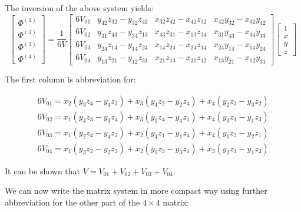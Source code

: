\documentclass[en]{minipw} %
\begin{document}
The inversion of the above system yields:
\begin{equation}
\begin{bmatrix}
\Phi^{(1)} \\
\Phi^{(2)} \\
\Phi^{(3)} \\
\Phi^{(4)}
\end{bmatrix}
=
\dfrac{1}{6V}
\begin{bmatrix}
6V_{01} & y_{42}z_{32} - y_{32}z_{42} & x_{32}z_{42} - x_{42}z_{32} & x_{42}y_{32} - x_{32}y_{42} \\
6V_{02} & y_{31}z_{43} - y_{34}z_{13} & x_{43}z_{31} - x_{13}z_{34} & x_{31}y_{43} - x_{34}y_{13} \\
6V_{03} & y_{24}z_{14} - y_{14}z_{24} & x_{14}z_{24} - x_{24}z_{14} & x_{24}y_{14} - x_{14}y_{24} \\
6V_{04} & y_{13}z_{21} - y_{12}z_{31} & x_{21}z_{13} - x_{31}z_{12} & x_{13}y_{21} - x_{12}y_{31}
\end{bmatrix}
\begin{bmatrix}
1 \\
x \\
y \\
z
\end{bmatrix}
\end{equation}

The first column is abbreviation for:

\begin{equation}
\begin{aligned}
6V_{01} = x_2(y_3z_4 - y_4z_3) + x_3(y_4z_2 - y_2z_4) +x_4(y_2z_3 - y_3z_2)
\\
6V_{02} = x_1(y_4z_3 - y_3z_4) + x_3(y_1z_4 - y_4z_1) +x_4(y_3z_1 - y_1z_3)
\\
6V_{03} = x_1(y_2z_4 - y_4z_2) + x_2(y_4z_1 - y_1z_4) +x_4(y_1z_2 - y_2z_1)
\\
6V_{04} = x_1(y_3z_2 - y_2z_3) + x_2(y_1z_3 - y_3z_1) +x_3(y_2z_1 - y_1z_2)
\end{aligned}
\end{equation}

It can be shown that $V = V_{01} + V_{02} + V_{03} + V_{04}$.

We can now write the matrix system in more compact way using further abbreviation for the other part of the $4 \times 4$ matrix:
\end{document}
